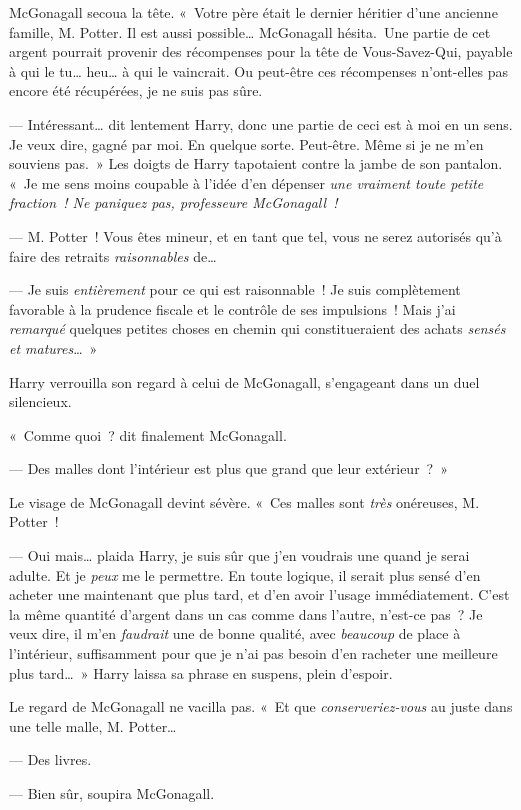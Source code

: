 McGonagall secoua la tête. «~Votre père était le dernier héritier d'une ancienne famille, M. Potter. Il est aussi possible… McGonagall hésita.~Une partie de cet argent pourrait provenir des récompenses pour la tête de Vous-Savez-Qui, payable à qui le tu… heu… à qui le vaincrait. Ou peut-être ces récompenses n'ont-elles pas encore été récupérées, je ne suis pas sûre.

--- Intéressant… dit lentement Harry, donc une partie de ceci est à moi en un sens. Je veux dire, gagné par moi. En quelque sorte.  Peut-être. Même si je ne m'en souviens pas.~» Les doigts de Harry tapotaient contre la jambe de son pantalon. «~Je me sens moins coupable à l'idée d'en dépenser \emph{une vraiment toute petite fraction~! Ne paniquez pas, professeure McGonagall~!}

--- M. Potter~! Vous êtes mineur, et en tant que tel, vous ne serez autorisés qu'à faire des retraits \emph{raisonnables} de…

--- Je suis \emph{entièrement} pour ce qui est raisonnable~! Je suis complètement favorable à la prudence fiscale et le contrôle de ses impulsions~! Mais j'ai \emph{remarqué} quelques petites choses en chemin qui constitueraient des achats \emph{sensés et matures}…~»

Harry verrouilla son regard à celui de McGonagall, s'engageant dans un duel silencieux.

«~Comme quoi~? dit finalement McGonagall.

--- Des malles dont l'intérieur est plus que grand que leur extérieur~?~»

Le visage de McGonagall devint sévère. «~Ces malles sont \emph{très} onéreuses, M. Potter~!

--- Oui mais… plaida Harry, je suis sûr que j'en voudrais une quand je serai adulte. Et je \emph{peux} me le permettre.  En toute logique, il serait plus sensé d'en acheter une maintenant que plus tard, et d'en avoir l'usage immédiatement. C'est la même quantité d'argent dans un cas comme dans l'autre, n'est-ce pas~? Je veux dire, il m'en \emph{faudrait} une de bonne qualité, avec \emph{beaucoup} de place à l'intérieur, suffisamment pour que je n'ai pas besoin d'en racheter une meilleure plus tard…~» Harry laissa sa phrase en suspens, plein d'espoir.

Le regard de McGonagall ne vacilla pas. «~Et que \emph{conserveriez-vous} au juste dans une telle malle, M. Potter…

--- Des livres.

--- Bien sûr, soupira McGonagall.

